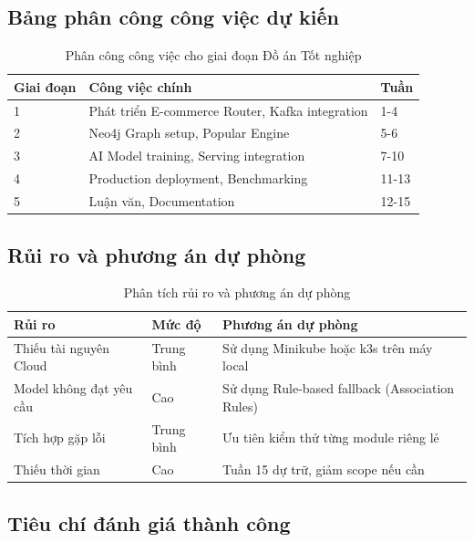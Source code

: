 \subsection{Bảng phân công công việc dự kiến}

\begin{table}[H]
\centering
\caption{Phân công công việc cho giai đoạn Đồ án Tốt nghiệp}
\label{tab:task-assignment}
\begin{tabular}{|l|p{8cm}|l|}
\hline
\textbf{Giai đoạn} & \textbf{Công việc chính} & \textbf{Tuần} \\
\hline
1 & Phát triển E-commerce Router, Kafka integration & 1-4 \\
\hline
2 & Neo4j Graph setup, Popular Engine & 5-6 \\
\hline
3 & AI Model training, Serving integration & 7-10 \\
\hline
4 & Production deployment, Benchmarking & 11-13 \\
\hline
5 & Luận văn, Documentation & 12-15 \\
\hline
\end{tabular}
\end{table}

\subsection{Rủi ro và phương án dự phòng}

\begin{table}[H]
\centering
\caption{Phân tích rủi ro và phương án dự phòng}
\label{tab:risk-analysis}
\begin{tabular}{|p{4cm}|p{3cm}|p{6cm}|}
\hline
\textbf{Rủi ro} & \textbf{Mức độ} & \textbf{Phương án dự phòng} \\
\hline
Thiếu tài nguyên Cloud & Trung bình & Sử dụng Minikube hoặc k3s trên máy local \\
\hline
Model không đạt yêu cầu & Cao & Sử dụng Rule-based fallback (Association Rules) \\
\hline
Tích hợp gặp lỗi & Trung bình & Ưu tiên kiểm thử từng module riêng lẻ \\
\hline
Thiếu thời gian & Cao & Tuần 15 dự trữ, giảm scope nếu cần \\
\hline
\end{tabular}
\end{table}

\subsection{Tiêu chí đánh giá thành công}

